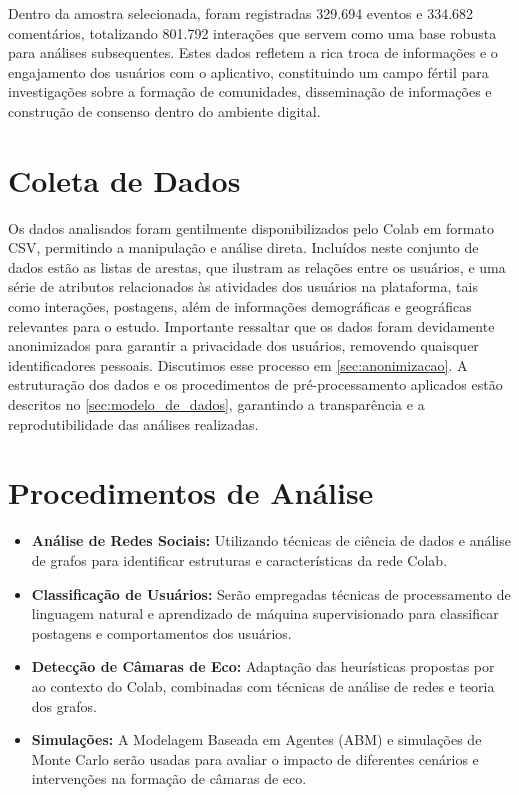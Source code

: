 Dentro da amostra selecionada, foram registradas 329.694 eventos e 334.682 comentários, totalizando 801.792 interações que servem como uma base robusta para análises subsequentes. Estes dados refletem a rica troca de informações e o engajamento dos usuários com o aplicativo, constituindo um campo fértil para investigações sobre a formação de comunidades, disseminação de informações e construção de consenso dentro do ambiente digital.

\section{Coleta de Dados}

Os dados analisados foram gentilmente disponibilizados pelo Colab em formato CSV, permitindo a manipulação e análise direta. Incluídos neste conjunto de dados estão as listas de arestas, que ilustram as relações entre os usuários, e uma série de atributos relacionados às atividades dos usuários na plataforma, tais como interações, postagens, além de informações demográficas e geográficas relevantes para o estudo. Importante ressaltar que os dados foram devidamente anonimizados para garantir a privacidade dos usuários, removendo quaisquer identificadores pessoais. Discutimos esse processo em \autoref{sec:anonimizacao}. A estruturação dos dados e os procedimentos de pré-processamento aplicados estão descritos no \autoref{sec:modelo_de_dados}, garantindo a transparência e a reprodutibilidade das análises realizadas.


\section{Procedimentos de Análise}

\begin{itemize}
	\item \textbf{Análise de Redes Sociais:} Utilizando técnicas de ciência de dados e análise de grafos para identificar estruturas e características da rede Colab.
	\item \textbf{Classificação de Usuários:} Serão empregadas técnicas de processamento de linguagem natural e aprendizado de máquina supervisionado para classificar postagens e comportamentos dos usuários.
	\item \textbf{Detecção de Câmaras de Eco:} Adaptação das heurísticas propostas por \cite{2023_Atiqi_BOOK} ao contexto do Colab, combinadas com técnicas de análise de redes e teoria dos grafos.
	\item \textbf{Simulações:} A Modelagem Baseada em Agentes (ABM) e simulações de Monte Carlo serão usadas para avaliar o impacto de diferentes cenários e intervenções na formação de câmaras de eco.
\end{itemize}

